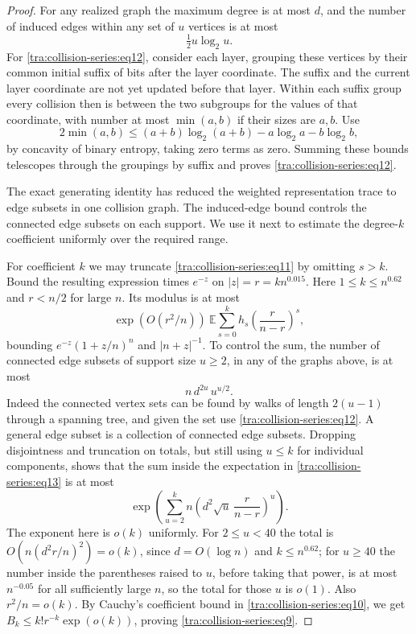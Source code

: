 \begin{proof}
For any realized graph the maximum degree is at most \(d\), and the number of induced edges within any set of \(u\) vertices is at most
\begin{equation}
\tfrac12 u\log_2 u. \label{tra:collision-series:eq12}
\end{equation}
For \eqref{tra:collision-series:eq12}, consider each layer, grouping these vertices by their common initial suffix of bits after the layer coordinate. The suffix and the current layer coordinate are not yet updated before that layer. Within each suffix group every collision then is between the two subgroups for the values of that coordinate, with number at most \(\min(a,b)\) if their sizes are \(a,b\). Use
\[
2\min(a,b)\le (a+b)\log_2(a+b)-a\log_2 a-b\log_2 b,
\]
by concavity of binary entropy, taking zero terms as zero. Summing these bounds telescopes through the groupings by suffix and proves \eqref{tra:collision-series:eq12}.

The exact generating identity has reduced the weighted representation trace to edge subsets in one collision graph. The induced-edge bound controls the connected edge subsets on each support. We use it next to estimate the degree-$k$ coefficient uniformly over the required range.

For coefficient \(k\) we may truncate \eqref{tra:collision-series:eq11} by omitting \(s>k\). Bound the resulting expression times \(e^{-z}\) on \(|z|=r=k n^{0.015}\). Here \(1\le k\le n^{0.62}\) and \(r<n/2\) for large \(n\). Its modulus is at most
\begin{equation}
\exp(O(r^2/n))\ \mathbb E\sum_{s=0}^k h_s \left(\frac{r}{n-r}\right)^s, \label{tra:collision-series:eq13}
\end{equation}
bounding \(e^{-z}(1+z/n)^n\) and \(|n+z|^{-1}\). To control the sum, the number of connected edge subsets of support size \(u\ge 2\), in any of the graphs above, is at most
\[
n\, d^{2u}\, u^{u/2}.
\]
Indeed the connected vertex sets can be found by walks of length \(2(u-1)\) through a spanning tree, and given the set use \eqref{tra:collision-series:eq12}. A general edge subset is a collection of connected edge subsets. Dropping disjointness and truncation on totals, but still using \(u\le k\) for individual components, shows that the sum inside the expectation in \eqref{tra:collision-series:eq13} is at most
\[
\exp\left(\sum_{u=2}^k n\left(d^2\sqrt u\,\frac{r}{n-r}\right)^u\right).
\]
The exponent here is \(o(k)\) uniformly. For \(2\le u<40\) the total is \(O(n(d^2 r/n)^2)=o(k)\), since \(d=O(\log n)\) and \(k\le n^{0.62}\); for \(u\ge 40\) the number inside the parentheses raised to \(u\), before taking that power, is at most \(n^{-0.05}\) for all sufficiently large \(n\), so the total for those \(u\) is \(o(1)\). Also \(r^2/n=o(k)\). By Cauchy's coefficient bound in \eqref{tra:collision-series:eq10}, we get \(B_k\le k! r^{-k}\exp(o(k))\), proving \eqref{tra:collision-series:eq9}.
\end{proof}
